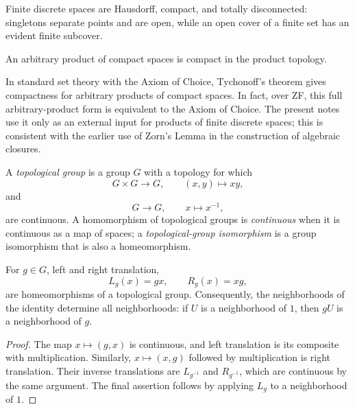 Finite discrete spaces are Hausdorff, compact, and totally disconnected:
singletons separate points and are open, while an open cover of a finite set
has an evident finite subcover.

\begin{theorem}
An arbitrary product of compact spaces is compact in the product topology.
\end{theorem}

\begin{remark}
In standard set theory with the Axiom of Choice, Tychonoff's theorem gives
compactness for arbitrary products of compact spaces.  In fact, over ZF, this
full arbitrary-product form is equivalent to the Axiom of Choice.  The present
notes use it only as an external input for products of finite discrete spaces;
this is consistent with the earlier use of Zorn's Lemma in the construction of
algebraic closures.
\end{remark}


\begin{definition}
A \emph{topological group} is a group \(G\) with a topology for which
\[
G\times G\longrightarrow G,\qquad (x,y)\longmapsto xy,
\]
and
\[
G\longrightarrow G,\qquad x\longmapsto x^{-1},
\]
are continuous.  A homomorphism of topological groups is \emph{continuous}
when it is continuous as a map of spaces; a \emph{topological-group
isomorphism} is a group isomorphism that is also a homeomorphism.
\end{definition}

\begin{proposition}
For \(g\in G\), left and right translation,
\[
L_g(x)=gx,\qquad R_g(x)=xg,
\]
are homeomorphisms of a topological group.  Consequently, the neighborhoods
of the identity determine all neighborhoods: if \(U\) is a neighborhood of
\(1\), then \(gU\) is a neighborhood of \(g\).
\end{proposition}
\begin{proof}
The map \(x\mapsto(g,x)\) is continuous, and left translation is its
composite with multiplication.  Similarly, \(x\mapsto(x,g)\) followed by
multiplication is right translation.  Their inverse translations are
\(L_{g^{-1}}\) and \(R_{g^{-1}}\), which are continuous by the same argument.
The final assertion follows by applying \(L_g\) to a neighborhood of \(1\).
\end{proof}

